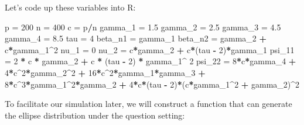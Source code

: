 \documentclass[
]{article}
\newenvironment{Shaded}{\begin{snugshade}}{\end{snugshade}}
\newcommand{\DecValTok}[1]{\textcolor[rgb]{0.00,0.00,0.81}{#1}}
\newcommand{\FloatTok}[1]{\textcolor[rgb]{0.00,0.00,0.81}{#1}}
\newcommand{\NormalTok}[1]{#1}
\newcommand{\OtherTok}[1]{\textcolor[rgb]{0.56,0.35,0.01}{#1}}
\newcommand{\SpecialCharTok}[1]{\textcolor[rgb]{0.81,0.36,0.00}{\textbf{#1}}}
\begin{document}
Let's code up these variables into R:

\begin{Shaded}
\begin{Highlighting}[]
\NormalTok{p }\OtherTok{=} \DecValTok{200}
\NormalTok{n }\OtherTok{=} \DecValTok{400}
\NormalTok{c }\OtherTok{=}\NormalTok{ p}\SpecialCharTok{/}\NormalTok{n}
\NormalTok{gamma\_1 }\OtherTok{=} \FloatTok{1.5}
\NormalTok{gamma\_2 }\OtherTok{=} \FloatTok{2.5}
\NormalTok{gamma\_3 }\OtherTok{=} \FloatTok{4.5}
\NormalTok{gamma\_4 }\OtherTok{=} \FloatTok{8.5}
\NormalTok{tau }\OtherTok{=} \DecValTok{4}
\NormalTok{beta\_n1 }\OtherTok{=}\NormalTok{ gamma\_1}
\NormalTok{beta\_n2 }\OtherTok{=}\NormalTok{ gamma\_2 }\SpecialCharTok{+}\NormalTok{ c}\SpecialCharTok{*}\NormalTok{gamma\_1}\SpecialCharTok{\^{}}\DecValTok{2}
\NormalTok{nu\_1 }\OtherTok{=} \DecValTok{0}
\NormalTok{nu\_2 }\OtherTok{=}\NormalTok{ c}\SpecialCharTok{*}\NormalTok{gamma\_2 }\SpecialCharTok{+}\NormalTok{ c}\SpecialCharTok{*}\NormalTok{(tau }\SpecialCharTok{{-}} \DecValTok{2}\NormalTok{)}\SpecialCharTok{*}\NormalTok{gamma\_1}
\NormalTok{psi\_11 }\OtherTok{=} \DecValTok{2} \SpecialCharTok{*}\NormalTok{ c }\SpecialCharTok{*}\NormalTok{ gamma\_2 }\SpecialCharTok{+}\NormalTok{ c }\SpecialCharTok{*}\NormalTok{ (tau }\SpecialCharTok{{-}} \DecValTok{2}\NormalTok{) }\SpecialCharTok{*}\NormalTok{ gamma\_1}\SpecialCharTok{\^{}} \DecValTok{2}
\NormalTok{psi\_22 }\OtherTok{=} \DecValTok{8}\SpecialCharTok{*}\NormalTok{c}\SpecialCharTok{*}\NormalTok{gamma\_4 }\SpecialCharTok{+} \DecValTok{4}\SpecialCharTok{*}\NormalTok{c}\SpecialCharTok{\^{}}\DecValTok{2}\SpecialCharTok{*}\NormalTok{gamma\_2}\SpecialCharTok{\^{}}\DecValTok{2} \SpecialCharTok{+} \DecValTok{16}\SpecialCharTok{*}\NormalTok{c}\SpecialCharTok{\^{}}\DecValTok{2}\SpecialCharTok{*}\NormalTok{gamma\_1}\SpecialCharTok{*}\NormalTok{gamma\_3 }\SpecialCharTok{+} \DecValTok{8}\SpecialCharTok{*}\NormalTok{c}\SpecialCharTok{\^{}}\DecValTok{3}\SpecialCharTok{*}\NormalTok{gamma\_1}\SpecialCharTok{\^{}}\DecValTok{2}\SpecialCharTok{*}\NormalTok{gamma\_2 }\SpecialCharTok{+} \DecValTok{4}\SpecialCharTok{*}\NormalTok{c}\SpecialCharTok{*}\NormalTok{(tau }\SpecialCharTok{{-}} \DecValTok{2}\NormalTok{)}\SpecialCharTok{*}\NormalTok{(c}\SpecialCharTok{*}\NormalTok{gamma\_1}\SpecialCharTok{\^{}}\DecValTok{2} \SpecialCharTok{+}\NormalTok{ gamma\_2)}\SpecialCharTok{\^{}}\DecValTok{2}
\end{Highlighting}
\end{Shaded}

To facilitate our simulation later, we will construct a function that
can generate the ellipse distribution under the question setting:
\end{document}

